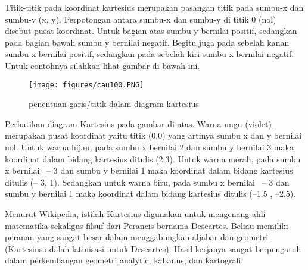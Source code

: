 Titik-titik pada koordinat kartesius merupakan pasangan titik pada sumbu-x dan sumbu-y (x, y). Perpotongan antara sumbu-x dan sumbu-y di titik 0 (nol) disebut pusat koordinat. Untuk bagian atas sumbu y bernilai positif, sedangkan pada bagian bawah sumbu y bernilai negatif. Begitu juga pada sebelah kanan sumbu x bernilai positif, sedangkan pada sebelah kiri sumbu x bernilai negatif. Untuk contohnya silahkan lihat gambar di bawah ini. 
\begin{figure}[ht]
	\centerline{\texttt{[image: figures/cau100.PNG]}}
	\caption{penentuan garis/titik dalam diagram kartesius}
	\label{cau100}
	\end{figure}

Perhatikan diagram Kartesius pada gambar di atas. Warna ungu (violet) merupakan pusat koordinat yaitu titik (0,0) yang artinya sumbu x dan y bernilai nol. Untuk warna hijau, pada sumbu x bernilai 2 dan sumbu y bernilai 3 maka koordinat dalam bidang kartesius ditulis (2,3). Untuk warna merah, pada sumbu x bernilai  – 3 dan sumbu y bernilai 1 maka koordinat dalam bidang kartesius ditulis (– 3, 1). Sedangkan untuk warna biru, pada sumbu x bernilai  – 3 dan sumbu y bernilai 1 maka koordinat dalam bidang kartesius ditulis (–1.5 , –2.5).

Menurut Wikipedia, istilah Kartesius digunakan untuk mengenang ahli matematika sekaligus filsuf dari Perancis bernama Descartes. Beliau memiliki peranan yang sangat besar dalam menggabungkan aljabar dan geometri (Kartesius adalah latinisasi untuk Descartes). Hasil kerjanya sangat berpengaruh dalam perkembangan geometri analytic, kalkulus, dan kartografi.


